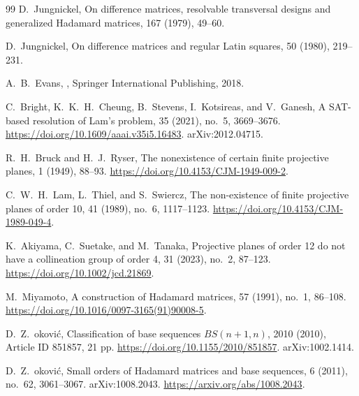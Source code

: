 \documentclass[11pt]{article}
\begin{document}
\begin{thebibliography}{99}
D.~Jungnickel,
\newblock On difference matrices, resolvable transversal designs and
  generalized Hadamard matrices,
 167 (1979), 49--60.

D.~Jungnickel,
\newblock On difference matrices and regular Latin squares,
 50 (1980), 219--231.

A.~B.~Evans,
,
\newblock Springer International Publishing, 2018.

C.~Bright, K.~K.~H.~Cheung, B.~Stevens, I.~Kotsireas, and V.~Ganesh,
\newblock A SAT-based resolution of Lam's problem,
 35 (2021),
  no.\ 5, 3669--3676.
\newblock \url{https://doi.org/10.1609/aaai.v35i5.16483}.
\newblock arXiv:2012.04715.

R.~H.~Bruck and H.~J.~Ryser,
\newblock The nonexistence of certain finite projective planes,
 1 (1949), 88--93.
\newblock \url{https://doi.org/10.4153/CJM-1949-009-2}.

C.~W.~H.~Lam, L.~Thiel, and S.~Swiercz,
\newblock The non-existence of finite projective planes of order 10,
 41 (1989), no.\ 6, 1117--1123.
\newblock \url{https://doi.org/10.4153/CJM-1989-049-4}.

K.~Akiyama, C.~Suetake, and M.~Tanaka,
\newblock Projective planes of order 12 do not have a collineation group of
  order 4,
 31 (2023), no.\ 2, 87--123.
\newblock \url{https://doi.org/10.1002/jcd.21869}.

M.~Miyamoto,
\newblock A construction of Hadamard matrices,
 57 (1991), no.\ 1, 86--108.
\newblock \url{https://doi.org/10.1016/0097-3165(91)90008-5}.

D.~Z.~\DJ okovi\'c,
\newblock Classification of base sequences \(BS(n+1,n)\),
 2010 (2010), Article ID 851857, 21 pp.
\newblock \url{https://doi.org/10.1155/2010/851857}.
\newblock arXiv:1002.1414.

D.~Z.~\DJ okovi\'c,
\newblock Small orders of Hadamard matrices and base sequences,
 6 (2011), no.\ 62, 3061--3067.
\newblock arXiv:1008.2043.
\newblock \url{https://arxiv.org/abs/1008.2043}.


\end{thebibliography}
\end{document}
